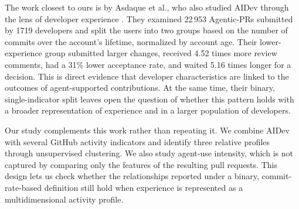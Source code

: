 The work closest to ours is by Asdaque et al., who also studied AIDev through the lens of developer experience \cite{asdaque2026novice}. They examined 22\,953 Agentic-PRs submitted by 1719 developers and split the users into two groups based on the number of commits over the account's lifetime, normalized by account age. Their lower-experience group submitted larger changes, received 4.52 times more review comments, had a 31\% lower acceptance rate, and waited 5.16 times longer for a decision. This is direct evidence that developer characteristics are linked to the outcomes of agent-supported contributions. At the same time, their binary, single-indicator split leaves open the question of whether this pattern holds with a broader representation of experience and in a larger population of developers.

Our study complements this work rather than repeating it. We combine AIDev with several GitHub activity indicators and identify three relative profiles through unsupervised clustering. We also study agent-use intensity, which is not captured by comparing only the features of the resulting pull requests. This design lets us check whether the relationships reported under a binary, commit-rate-based definition still hold when experience is represented as a multidimensional activity profile.
